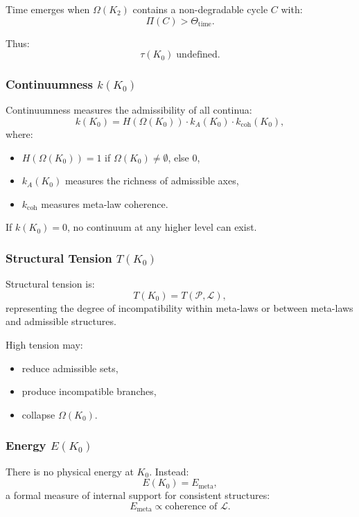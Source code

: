 Time emerges when $\Omega(K_2)$ contains a non-degradable cycle
$C$ with:
\[
\Pi(C) > \Theta_{\mathrm{time}}.
\]

Thus:
\[
\tau(K_0) \;\text{undefined}.
\]

\subsubsection{Continuumness \texorpdfstring{$k(K_0)$}{k(K_0)}}

Continuumness measures the admissibility of all continua:
\[
k(K_0) = 
H(\Omega(K_0)) \cdot
k_A(K_0) \cdot
k_{\mathrm{coh}}(K_0),
\]
where:
\begin{itemize}
    \item $H(\Omega(K_0)) = 1$ if $\Omega(K_0)\neq\emptyset$, else $0$,
    \item $k_A(K_0)$ measures the richness of admissible axes,
    \item $k_{\mathrm{coh}}$ measures meta-law coherence.
\end{itemize}

If $k(K_0)=0$, no continuum at any higher level can exist.

\subsubsection{Structural Tension \texorpdfstring{$T(K_0)$}{T(K_0)}}

Structural tension is:
\[
T(K_0) = T(\mathcal{P}, \mathcal{L}),
\]
representing the degree of incompatibility within meta-laws or between
meta-laws and admissible structures.

High tension may:
\begin{itemize}
    \item reduce admissible sets,
    \item produce incompatible branches,
    \item collapse $\Omega(K_0)$.
\end{itemize}

\subsubsection{Energy \texorpdfstring{$E(K_0)$}{E(K_0)}}

There is no physical energy at $K_0$.  
Instead:
\[
E(K_0) = E_{\mathrm{meta}},
\]
a formal measure of internal support for consistent structures:
\[
E_{\mathrm{meta}} \propto \text{coherence of }\mathcal{L}.
\]

